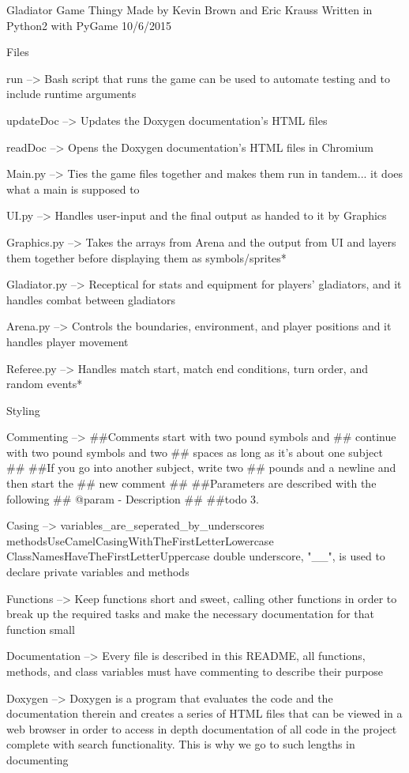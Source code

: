 Gladiator Game Thingy Made by Kevin Brown and Eric Krauss Written in Python2 with Py\+Game 10/6/2015

Files \begin{DoxyVerb}run -->
    Bash script that runs the game
    can be used to automate testing
    and to include runtime arguments

updateDoc -->
    Updates the Doxygen documentation's
    HTML files

readDoc -->
    Opens the Doxygen documentation's
    HTML files in Chromium

Main.py -->
    Ties the game files together and
    makes them run in tandem...
    it does what a main is supposed to

UI.py -->
    Handles user-input and the final
    output as handed to it by Graphics

Graphics.py -->
    Takes the arrays from Arena and the
    output from UI and layers them
    together before displaying them as
    symbols/sprites*

Gladiator.py -->
    Receptical for stats and equipment
    for players' gladiators, and it
    handles combat between gladiators

Arena.py -->
    Controls the boundaries, environment,
    and player positions and it handles
    player movement

Referee.py -->
    Handles match start, match end
    conditions, turn order, and
    random events*
\end{DoxyVerb}


Styling \begin{DoxyVerb}Commenting -->  
    ##Comments start with two pound symbols and
    ##  continue with two pound symbols and two
    ##  spaces as long as it's about one subject
    ##
    ##If you go into another subject, write two 
    ##  pounds and a newline and then start the
    ##  new comment
    ##
    ##Parameters are described with the following
    ##  @param - Description
    ##
    ##\xrefitem todo 3.

Casing -->
    variables_are_seperated_by_underscores
    methodsUseCamelCasingWithTheFirstLetterLowercase
    ClassNamesHaveTheFirstLetterUppercase
    double underscore, "__", is used to
    declare private variables and methods



Functions -->
    Keep functions short and sweet, calling other
    functions in order to break up the required
    tasks and make the necessary documentation for
    that function small

Documentation -->
    Every file is described in this README, all
    functions, methods, and class variables must
    have commenting to describe their purpose

Doxygen -->
    Doxygen is a program that evaluates the code
    and the documentation therein and creates a
    series of HTML files that can be viewed in a
    web browser in order to access in depth
    documentation of all code in the project
    complete with search functionality.  This
    is why we go to such lengths in documenting\end{DoxyVerb}
 